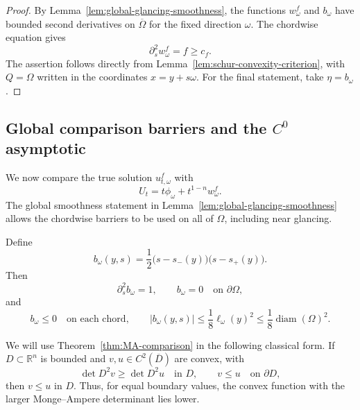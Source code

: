 \documentclass[11pt]{article}
\numberwithin{equation}{section}
\newcommand{\R}{\mathbb R}
\begin{document}
\begin{proof}
By Lemma~\ref{lem:global-glancing-smoothness}, the functions \(w_\omega^f\) and \(b_\omega\) have bounded second derivatives on \(\overline\Omega\) for the fixed direction \(\omega\).  The chordwise equation gives
\[
    \partial_s^2w_\omega^f=f\ge c_f.
\]
The assertion follows directly from Lemma~\ref{lem:schur-convexity-criterion}, with \(Q=\Omega\) written in the coordinates \(x=y+s\omega\).  For the final statement, take \(\eta=b_\omega\).
\end{proof}

\subsection{Global comparison barriers and the \texorpdfstring{\(C^0\)}{C0} asymptotic}\label{subsec:barrier-construction}

We now compare the true solution \(u_{t,\omega}^f\) with
\[
    U_t=t\phi_\omega+t^{1-n}w_\omega^f .
\]
The global smoothness statement in Lemma~\ref{lem:global-glancing-smoothness} allows the chordwise barriers to be used on all of \(\Omega\), including near glancing.

Define
\begin{equation}\label{eq:barrier-b-explicit}
    b_\omega(y,s)
    =
    \frac12\bigl(s-s_-(y)\bigr)\bigl(s-s_+(y)\bigr).
\end{equation}
Then
\begin{equation}\label{eq:barrier-b}
    \partial_s^2 b_\omega=1,
    \qquad
    b_\omega=0\quad\text{on }\partial\Omega,
\end{equation}
and
\begin{equation}\label{eq:b-negative}
    b_\omega\le0
    \quad\text{on each chord},
    \qquad
    |b_\omega(y,s)|\le \frac18 \ell_\omega(y)^2
    \le \frac18\operatorname{diam}(\Omega)^2 .
\end{equation}

We will use Theorem~\ref{thm:MA-comparison} in the following classical form.  If \(D\subset\R^n\) is bounded and \(v,u\in C^2(\overline D)\) are convex, with
\[
    \det D^2v\ge \det D^2u\quad\text{in }D,
    \qquad
    v\le u\quad\text{on }\partial D,
\]
then \(v\le u\) in \(D\).  Thus, for equal boundary values, the convex function with the larger Monge--Ampere determinant lies lower.
\end{document}
